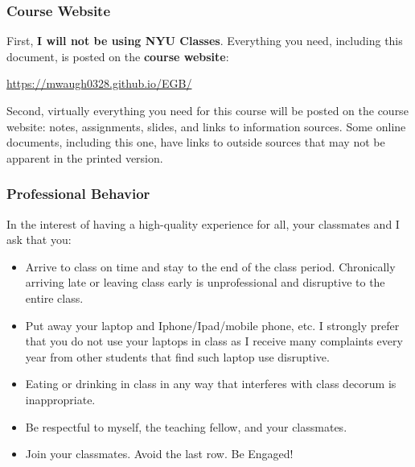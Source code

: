 \documentclass[12pt,pdftex,twoside,letterpaper]{exam}
\begin{document}
\subsubsection*{Course Website}
First, \textbf{I will not be using NYU Classes}. Everything you need, including this document, is posted on
the {\bf course website\/}:
%
\vspace{-0.15in}
\begin{center}
\url{https://mwaugh0328.github.io/EGB/}
\end{center}

Second, virtually everything you need for this course will be posted on the course website: notes, assignments, slides, and links to information sources. Some online documents, including this one, have links to outside sources that may not be apparent in the printed version.

\subsubsection*{Professional Behavior}
In the interest of having a high-quality experience for all,
your classmates and I ask that you:
\begin{itemize}
\item Arrive to class on time and stay to the end of the class period. Chronically arriving late or leaving class early is unprofessional and disruptive to the entire class.

\item Put away your laptop and Iphone/Ipad/mobile phone, etc. I strongly prefer that you do not use your laptops in class as I receive many complaints every year from other students that find such laptop use disruptive.

\item Eating or drinking in class in any way that interferes with class decorum is inappropriate.

\item Be respectful to myself, the teaching fellow, and your classmates.

\item Join your classmates. Avoid the last row. Be Engaged!
\end{itemize}
\end{document}
